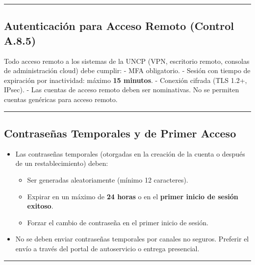 \documentclass[10pt,letterpaper]{article}
\begin{document}
\begin{center}\rule{0.5\linewidth}{0.5pt}\end{center}

\subsection{Autenticación para Acceso Remoto (Control
A.8.5)}\label{autenticaciuxf3n-para-acceso-remoto-control-a.8.5}

Todo acceso remoto a los sistemas de la UNCP (VPN, escritorio remoto,
consolas de administración cloud) debe cumplir: - MFA obligatorio. -
Sesión con tiempo de expiración por inactividad: máximo \textbf{15
minutos}. - Conexión cifrada (TLS 1.2+, IPsec). - Las cuentas de acceso
remoto deben ser nominativas. No se permiten cuentas genéricas para
acceso remoto.

\begin{center}\rule{0.5\linewidth}{0.5pt}\end{center}

\subsection{Contraseñas Temporales y de Primer
Acceso}\label{contraseuxf1as-temporales-y-de-primer-acceso}

\begin{itemize}
\tightlist
\item
  Las contraseñas temporales (otorgadas en la creación de la cuenta o
  después de un restablecimiento) deben:

  \begin{itemize}
  \tightlist
  \item
    Ser generadas aleatoriamente (mínimo 12 caracteres).
  \item
    Expirar en un máximo de \textbf{24 horas} o en el \textbf{primer
    inicio de sesión exitoso}.
  \item
    Forzar el cambio de contraseña en el primer inicio de sesión.
  \end{itemize}
\item
  No se deben enviar contraseñas temporales por canales no seguros.
  Preferir el envío a través del portal de autoservicio o entrega
  presencial.
\end{itemize}

\begin{center}\rule{0.5\linewidth}{0.5pt}\end{center}
\end{document}
